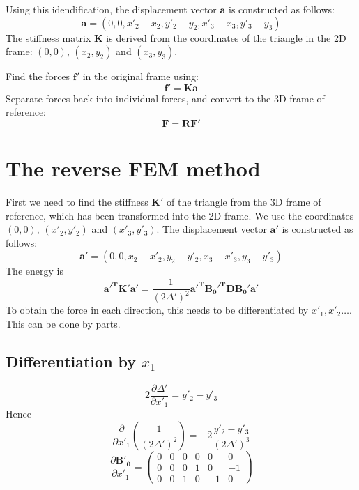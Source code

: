 \documentclass{article}
\renewcommand{\vec}[1]{\mathbf{#1}}
\begin{document}
Using this idendification, the displacement vector 
$\vec{a}$ is constructed as follows:
\begin{displaymath}
  \vec{a} = (0, 0, x'_2-x_2, y'_2-y_2, x'_3-x_3, y'_3-y_3)
\end{displaymath}
The stiffness matrix $\vec{K}$ is derived from the coordinates of the
triangle in the 2D frame: $(0,0)$, $(x_2, y_2)$ and  $(x_3, y_3)$.

Find the forces $\vec{f'}$ in the original frame using:
\begin{displaymath}
  \vec{f'} = \vec{K}\vec{a}
\end{displaymath}
Separate forces back into individual forces, and convert to the 3D
frame of reference:
\begin{displaymath}
  \vec{F} = \vec{R}\vec{F'}
\end{displaymath}

\section{The reverse FEM method}
\label{fem2:sec:reverse-fem-method}

First we need to find the stiffness $\vec{K'}$ of the triangle from
the 3D frame of reference, which has been transformed into the 2D
frame. We use the coordinates $(0,0)$, $(x'_2, y'_2)$ and $(x'_3,
y'_3)$. The displacement vector 
$\vec{a'}$ is constructed as follows:
\begin{displaymath}
  \vec{a'} = (0, 0, x_2-x'_2, y_2-y'_2, x_3-x'_3, y_3-y'_3)
\end{displaymath}
The energy is
\begin{displaymath}
  \vec{a'^T}\vec{K'}\vec{a'} = \frac{1}{(2\Delta')^2}
  \vec{a'^T}\vec{B_0'^T}\vec{D}\vec{B_0'}\vec{a'}
\end{displaymath}
To obtain the force in each direction, this needs to be differentiated
by $x'_1, x'_2\dots$. This can be done by parts.

\subsection{Differentiation by $x_1$}
\label{fem2:sec:differentiation-x_1}

\begin{displaymath}
  2\frac{\partial \Delta'}{\partial x'_1} = y'_2 - y'_3
\end{displaymath}
Hence 
\begin{displaymath}
  \frac{\partial}{\partial x'_1}\left(\frac{1}{(2\Delta')^2}\right) = 
  -2\frac{y'_2 - y'_3}{(2\Delta')^3}
\end{displaymath}
\begin{displaymath}
  \frac{\partial \vec{B'_0}}{\partial x'_1} = 
  \begin{pmatrix}
    0 & 0 & 0 & 0 & 0  & 0 \\
    0 & 0 & 0 & 1 & 0  & -1 \\
    0 & 0 & 1 & 0 & -1 & 0
  \end{pmatrix}
\end{displaymath}
\end{document}
